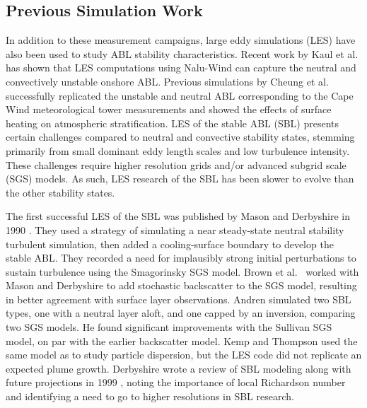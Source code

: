 \documentclass[conf]{new-aiaa}
\begin{document}
\subsection{Previous Simulation Work}

In addition to these measurement campaigns, large eddy simulations (LES) have
also been used to study ABL stability characteristics.  Recent work by
Kaul et al. \cite{kaul2020large} has shown that LES computations using
Nalu-Wind can capture the neutral and convectively unstable onshore
ABL.  Previous simulations by Cheung et al. \cite{cheung2020large}
successfully replicated the unstable and neutral ABL corresponding to
the Cape Wind meteorological tower measurements
\cite{archer2016predominance} and showed the effects of surface
heating on atmospheric stratification. LES of the stable ABL (SBL) presents
certain challenges compared to neutral and convective stability states, stemming
primarily from small dominant eddy length scales and low turbulence intensity.
These challenges require higher resolution grids and/or advanced subgrid
scale (SGS) models. As such, LES research of the SBL has been slower
to evolve than the other stability states.

The first successful LES of the SBL was published by Mason and Derbyshire in
1990 \cite{Mason1990}. They used a strategy of simulating a near steady-state
neutral stability turbulent simulation, then added a cooling-surface boundary
to develop the stable ABL. They recorded a need for implausibly strong initial
perturbations to sustain turbulence using the Smagorinsky SGS model. Brown et
al.\ \cite{Brown1994} worked with Mason and Derbyshire to add stochastic backscatter
to the SGS model, resulting in better agreement with surface layer observations.
Andren \cite{Andren1995} simulated two SBL types, one with a neutral layer aloft, and
one capped by an inversion, comparing two SGS models. He found significant improvements
with the Sullivan SGS model, on par with the earlier backscatter model. Kemp and
Thompson \cite{Kemp1996} used the same model as \cite{Brown1994} to study particle
dispersion, but the LES code did not replicate an expected plume growth. Derbyshire
wrote a review of SBL modeling along with future projections in 1999 \cite{Derbyshire1999},
noting the importance of local Richardson number and identifying a need to go
to higher resolutions in SBL research.
\end{document}
